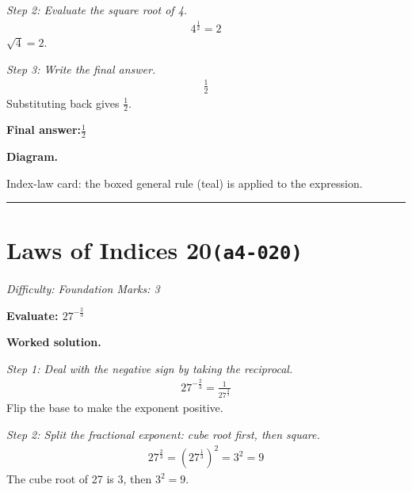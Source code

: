 \documentclass[11pt]{article}
\newcommand{\question}[1]{\par\medskip\noindent\textbf{#1}\par}
\begin{document}
\textit{Step 2: Evaluate the square root of 4.}
\[\begin{gathered}
4^{\frac{1}{2}} = 2
\end{gathered}\]
\( \sqrt{4} = 2 \).

\textit{Step 3: Write the final answer.}
\[\begin{gathered}
\frac{1}{2}
\end{gathered}\]
Substituting back gives \( \frac{1}{2} \).

\begin{answerbox}
\textbf{Final answer:}\quad \(\displaystyle \frac{1}{2}\)
\end{answerbox}
\textbf{Diagram.}

\begin{center}
\end{center}
\small Index-law card: the boxed general rule (teal) is applied to the expression.\normalsize

\medskip\hrule

\section*{Laws of Indices 20\quad\small\texttt{(a4-020)}}
\textit{Difficulty: Foundation \quad\textbar\quad Marks: 3}

\question{Evaluate: \( 27^{-\frac{2}{3}} \)}

\textbf{Worked solution.}

\textit{Step 1: Deal with the negative sign by taking the reciprocal.}
\[\begin{gathered}
27^{-\frac{2}{3}} = \frac{1}{27^{\frac{2}{3}}}
\end{gathered}\]
Flip the base to make the exponent positive.

\textit{Step 2: Split the fractional exponent: cube root first, then square.}
\[\begin{gathered}
27^{\frac{2}{3}} = \left(27^{\frac{1}{3}}\right)^2 = 3^2 = 9
\end{gathered}\]
The cube root of 27 is 3, then \( 3^2 = 9 \).
\end{document}
